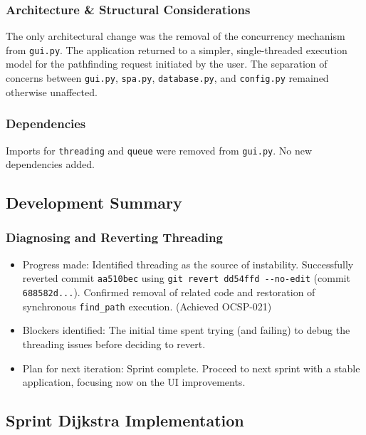 \subsubsection{Architecture \& Structural Considerations}
The only architectural change was the removal of the concurrency mechanism from \verb|gui.py|. The application returned to a simpler, single-threaded execution model for the pathfinding request initiated by the user. The separation of concerns between \verb|gui.py|, \verb|spa.py|, \verb|database.py|, and \verb|config.py| remained otherwise unaffected.

\subsubsection{Dependencies}
Imports for \verb|threading| and \verb|queue| were removed from \verb|gui.py|. No new dependencies added.

\subsection{Development Summary}

\subsubsection{Diagnosing and Reverting Threading}
\begin{itemize}
	\item Progress made: Identified threading as the source of instability. Successfully reverted commit \verb|aa510bec| using \verb|git revert dd54ffd --no-edit| (commit \verb|688582d...|). Confirmed removal of related code and restoration of synchronous \verb|find_path| execution. (Achieved OCSP-021)
	\item Blockers identified: The initial time spent trying (and failing) to debug the threading issues before deciding to revert.
	\item Plan for next iteration: Sprint complete. Proceed to next sprint with a stable application, focusing now on the UI improvements.
\end{itemize}

\clearpage
\subsection{Sprint Dijkstra Implementation}

